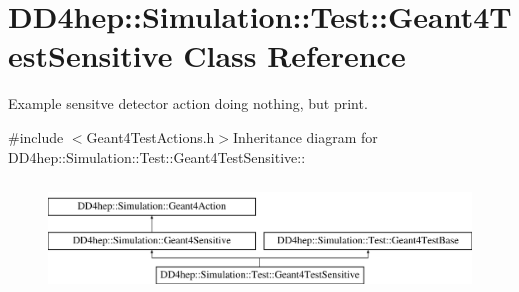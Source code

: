 \hypertarget{class_d_d4hep_1_1_simulation_1_1_test_1_1_geant4_test_sensitive}{
\section{DD4hep::Simulation::Test::Geant4TestSensitive Class Reference}
\label{class_d_d4hep_1_1_simulation_1_1_test_1_1_geant4_test_sensitive}
}


Example sensitve detector action doing nothing, but print.  


{\ttfamily \#include $<$Geant4TestActions.h$>$}Inheritance diagram for DD4hep::Simulation::Test::Geant4TestSensitive::\begin{figure}[H]
\begin{center}
\leavevmode
\includegraphics[height=3cm]{class_d_d4hep_1_1_simulation_1_1_test_1_1_geant4_test_sensitive}
\end{center}
\end{figure}
